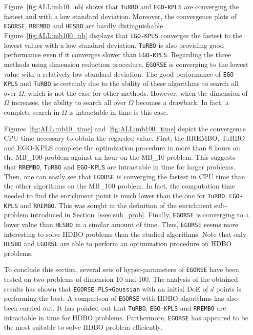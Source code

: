 Figure~\ref{fig:ALL:mb10_nb} shows that  \texttt{TuRBO} and  \texttt{EGO-KPLS} are converging the fastest and with a low standard deviation.
Moreover, the convergence plots of  \texttt{EGORSE},  \texttt{RREMBO} and  \texttt{HESBO} are hardly distinguishable. 
Figure~\ref{fig:ALL:mb100_nb} displays that  \texttt{EGO-KPLS} converges the fastest to the lowest values with a low standard deviation.
 \texttt{TuRBO} is also providing good performance even if it converges slower than  \texttt{EGO-KPLS}. 
Regarding the three methods using dimension reduction procedure,  \texttt{EGORSE} is converging to the lowest value with a relatively low standard deviation.
The good performance of  \texttt{EGO-KPLS} and  \texttt{TuRBO} is certainly due to the ability of these algorithms to search all over $\Omega$, which is not the case for other methods.
However, when the dimension of $\Omega$ increases, the ability to search all over $\Omega$ becomes a drawback. In fact, a complete search in $\Omega$ is intractable in time is this case.

Figures~\ref{fig:ALL:mb10_time} and~\ref{fig:ALL:mb100_time} depict the convergence CPU time necessary to obtain the regarded value.
First, the RREMBO, TuRBO and EGO-KPLS complete the optimization procedure in more than 8 hours on the MB\_100 problem against an hour on the MB\_10 problem.
This suggests that  \texttt{RREMBO},  \texttt{TuRBO} and  \texttt{EGO-KPLS} are intractable in time for larger problems.
Then, one can easily see that \texttt{EGORSE} is converging the fastest in CPU time than the other algorithms on the MB\_100 problem.
In fact, the computation time needed to find the enrichment point is much lower than the one for  \texttt{TuRBO},  \texttt{EGO-KPLS} and  \texttt{RREMBO}.
This was sought in the definition of the enrichment sub-problem introduced in Section~\ref{ssec:sub_prob}.
Finally,  \texttt{EGORSE} is converging to a lower value than  \texttt{HESBO} in a similar amount of time. 
Thus,  \texttt{EGORSE} seems more interesting to solve HDBO problems than the studied algorithms.
Note that only  \texttt{HESBO} and  \texttt{EGORSE} are able to perform an optimization procedure on HDBO problems.

To conclude this section, several sets of hyper-parameters of  \texttt{EGORSE} have been tested on two problems of dimension 10 and 100. 
The analysis of the obtained results has shown that  \texttt{EGORSE PLS+Gaussian} with an initial DoE of $d$ points is performing the best. 
A comparison of  \texttt{EGORSE} with HDBO algorithms has also been carried out. 
It has pointed out that  \texttt{TuRBO},  \texttt{EGO-KPLS} and  \texttt{RREMBO} are intractable in time for HDBO problems.
Furthermore,  \texttt{EGORSE} has appeared to be the most suitable to solve HDBO problem efficiently. 

